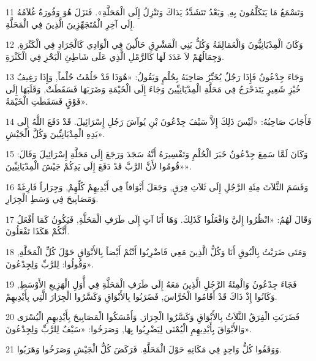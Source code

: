 \par 11 وَتَسْمَعُ مَا يَتَكَلَّمُونَ بِهِ, وَبَعْدُ تَتَشَدَّدُ يَدَاكَ وَتَنْزِلُ إِلَى الْمَحَلَّةِ». فَنَزَلَ هُوَ وَفُورَةُ غُلاَمُهُ إِلَى آخِرِ الْمُتَجَهِّزِينَ الَّذِينَ فِي الْمَحَلَّةِ.
\par 12 وَكَانَ الْمِدْيَانِيُّونَ وَالْعَمَالِقَةُ وَكُلُّ بَنِي الْمَشْرِقِ حَالِّينَ فِي الْوَادِي كَالْجَرَادِ فِي الْكَثْرَةِ, وَجِمَالُهُمْ لاَ عَدَدَ لَهَا كَالرَّمْلِ الَّذِي عَلَى شَاطِئِ الْبَحْرِ فِي الْكَثْرَةِ.
\par 13 وَجَاءَ جِدْعُونُ فَإِذَا رَجُلٌ يُخَبِّرُ صَاحِبَهُ بِحُلْمٍ وَيَقُولُ: «هُوَذَا قَدْ حَلُمْتُ حُلْماً, وَإِذَا رَغِيفُ خُبْزِ شَعِيرٍ يَتَدَحْرَجُ فِي مَحَلَّةِ الْمِدْيَانِيِّينَ وَجَاءَ إِلَى الْخَيْمَةِ وَضَرَبَهَا فَسَقَطَتْ, وَقَلَبَهَا إِلَى فَوْقٍ فَسَقَطَتِ الْخَيْمَةُ».
\par 14 فَأَجَابَ صَاحِبُهُ: «لَيْسَ ذَلِكَ إِلاَّ سَيْفَ جِدْعُونَ بْنِ يُوآشَ رَجُلِ إِسْرَائِيلَ. قَدْ دَفَعَ اللَّهُ إِلَى يَدِهِ الْمِدْيَانِيِّينَ وَكُلَّ الْجَيْشِ».
\par 15 وَكَانَ لَمَّا سَمِعَ جِدْعُونُ خَبَرَ الْحُلْمِ وَتَفْسِيرَهُ أَنَّهُ سَجَدَ وَرَجَعَ إِلَى مَحَلَّةِ إِسْرَائِيلَ وَقَالَ: «قُومُوا لأَنَّ الرَّبَّ قَدْ دَفَعَ إِلَى يَدِكُمْ جَيْشَ الْمِدْيَانِيِّينَ».
\par 16 وَقَسَمَ الثَّلاَثَ مِئَةِ الرَّجُلِ إِلَى ثَلاَثِ فِرَقٍ, وَجَعَلَ أَبْوَاقاً فِي أَيْدِيهِمْ كُلِّهِمْ, وَجِرَاراً فَارِغَةً وَمَصَابِيحَ فِي وَسَطِ الْجِرَارِ.
\par 17 وَقَالَ لَهُمُ: «انْظُرُوا إِلَيَّ وَافْعَلُوا كَذَلِكَ. وَهَا أَنَا آتٍ إِلَى طَرَفِ الْمَحَلَّةِ, فَيَكُونُ كَمَا أَفْعَلُ أَنَّكُمْ هَكَذَا تَفْعَلُونَ.
\par 18 وَمَتَى ضَرَبْتُ بِالْبُوقِ أَنَا وَكُلُّ الَّذِينَ مَعِي فَاضْرِبُوا أَنْتُمْ أَيْضاً بِالأَبْوَاقِ حَوْلَ كُلِّ الْمَحَلَّةِ, وَقُولُوا: لِلرَّبِّ وَلِجِدْعُونَ».
\par 19 فَجَاءَ جِدْعُونُ وَالْمِئَةُ الرَّجُلِ الَّذِينَ مَعَهُ إِلَى طَرَفِ الْمَحَلَّةِ فِي أَّوَلِ الْهَزِيعِ الأَوْسَطِ, وَكَانُوا إِذْ ذَاكَ قَدْ أَقَامُوا الْحُرَّاسَ, فَضَرَبُوا بِالأَبْوَاقِ وَكَسَّرُوا الْجِرَارَ الَّتِي بِأَيْدِيهِمْ.
\par 20 فَضَرَبَتِ الْفِرَقُ الثَّلاَثُ بِالأَبْوَاقِ وَكَسَّرُوا الْجِرَارَ, وَأَمْسَكُوا الْمَصَابِيحَ بِأَيْدِيهِمِ الْيُسْرَى وَالأَبْوَاقَ بِأَيْدِيهِمِ الْيُمْنَى لِيَضْرِبُوا بِهَا, وَصَرَخُوا: «سَيْفٌ لِلرَّبِّ وَلِجِدْعُونَ».
\par 21 وَوَقَفُوا كُلُّ وَاحِدٍ فِي مَكَانِهِ حَوْلَ الْمَحَلَّةِ. فَرَكَضَ كُلُّ الْجَيْشِ وَصَرَخُوا وَهَرَبُوا.

